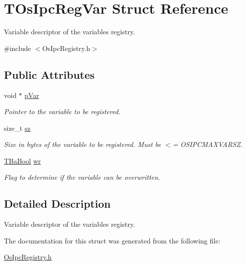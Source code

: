 \hypertarget{structTOsIpcRegVar}{}\section{T\+Os\+Ipc\+Reg\+Var Struct Reference}
\label{structTOsIpcRegVar}


Variable descriptor of the variables registry.  




{\ttfamily \#include $<$Os\+Ipc\+Registry.\+h$>$}

\subsection*{Public Attributes}
\begin{DoxyCompactItemize}
\item 
\mbox{\label{structTOsIpcRegVar_ab90584847b3e4f4bdf663ab55cc16662}} 
void $\ast$ \hyperlink{structTOsIpcRegVar_ab90584847b3e4f4bdf663ab55cc16662}{p\+Var}
\begin{DoxyCompactList}\small\item\em Pointer to the variable to be registered. \end{DoxyCompactList}\item 
\mbox{\label{structTOsIpcRegVar_a75571e76870b0226aa864f16eee31298}} 
size\+\_\+t \hyperlink{structTOsIpcRegVar_a75571e76870b0226aa864f16eee31298}{sz}
\begin{DoxyCompactList}\small\item\em Size in bytes of the variable to be registered. Must be $<$= O\+S\+I\+P\+C\+M\+A\+X\+V\+A\+R\+SZ. \end{DoxyCompactList}\item 
\mbox{\label{structTOsIpcRegVar_a5fd400d6adcb70017082bac6a488ba89}} 
\hyperlink{BaBool_8h_a5fe1eb8d6ba045ac2251a8f369c2e7b6}{T\+Ba\+Bool} \hyperlink{structTOsIpcRegVar_a5fd400d6adcb70017082bac6a488ba89}{wr}
\begin{DoxyCompactList}\small\item\em Flag to determine if the variable can be overwritten. \end{DoxyCompactList}\end{DoxyCompactItemize}


\subsection{Detailed Description}
Variable descriptor of the variables registry. 

The documentation for this struct was generated from the following file\+:\begin{DoxyCompactItemize}
\item 
\hyperlink{OsIpcRegistry_8h}{Os\+Ipc\+Registry.\+h}\end{DoxyCompactItemize}

